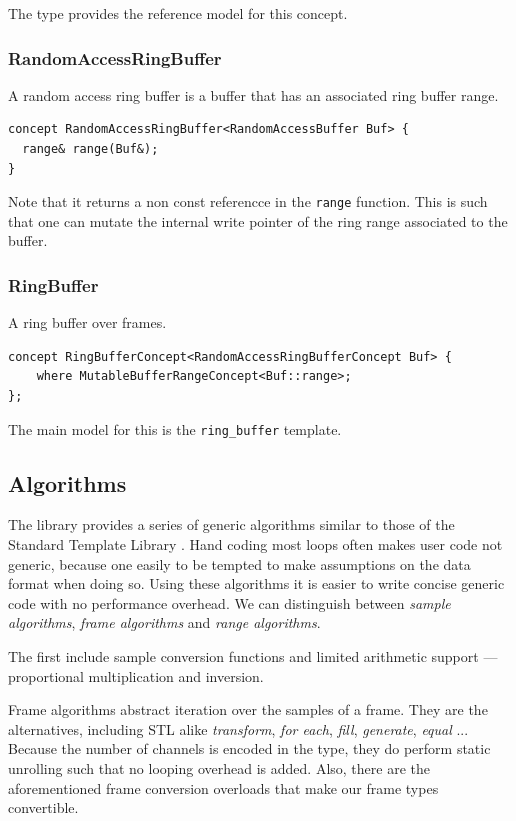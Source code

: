 The  type provides the reference model for
this concept.

\subsubsection{RandomAccessRingBuffer}

A random access ring buffer is a buffer that has an associated ring
buffer range.

\begin{lstlisting}
concept RandomAccessRingBuffer<RandomAccessBuffer Buf> {
  range& range(Buf&);
}
\end{lstlisting}

Note that it returns a non const referencce in the \texttt{range}
function. This is such that one can mutate the internal write pointer
of the ring range associated to the buffer.

\subsubsection{RingBuffer}

A ring buffer over frames.
\begin{lstlisting}
concept RingBufferConcept<RandomAccessRingBufferConcept Buf> {
    where MutableBufferRangeConcept<Buf::range>;
};
\end{lstlisting}

The main model for this is the \texttt{ring\_buffer} template.

\subsection{Algorithms}

 The library
provides a series of generic algorithms similar to those of the
Standard Template Library \cite{stepanov94stl}. Hand coding most loops
often makes user code not generic, because one easily to be tempted to
make assumptions on the data format when doing so. Using these
algorithms it is easier to write concise generic code with no
performance overhead.  We can distinguish between \emph{sample
  algorithms}, \emph{frame algorithms} and \emph{range algorithms}.

The first include sample conversion functions and limited arithmetic
support --- proportional multiplication and inversion.

Frame algorithms abstract iteration over the samples of a
frame. They are the  alternatives, including STL alike
\emph{transform}, \emph{for each}, \emph{fill}, \emph{generate},
\emph{equal} ... Because the number of channels is encoded in the
type, they do perform static unrolling such that no looping overhead
is added. Also, there are the aforementioned frame conversion
overloads that make our frame types convertible.

